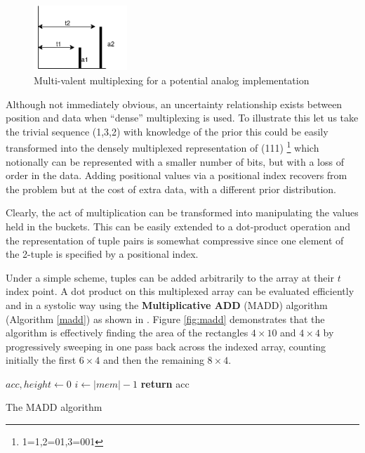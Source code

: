 \documentclass{article}
\begin{document}
\begin{figure}[ht]
	\centerline{\includegraphics[width=100pt]{figures/multiplex2.png}}
	\caption{Multi-valent multiplexing for a potential analog implementation}\label{fig:multiply}
\end{figure}

Although not immediately obvious, an uncertainty relationship exists between position and data when ``dense'' multiplexing is used. To illustrate this let us take the trivial sequence (1,3,2) with knowledge of the prior this could be easily transformed into the densely multiplexed representation of (111) \footnote{1=1,2=01,3=001} which notionally can be represented with a smaller number of bits, but with a loss of order in the data. Adding positional values via a positional index recovers from the problem but at the cost of extra data, with a different prior distribution.

Clearly, the act of multiplication can be transformed into manipulating the values held in the buckets. This can be easily extended to a dot-product operation and the representation of tuple pairs is somewhat compressive since one element of the 2-tuple is specified by a positional index.

Under a simple scheme, tuples can be added arbitrarily to the array at their $t$ index point.  A dot product on this multiplexed array can be evaluated efficiently and in a systolic way using the \textbf{Multiplicative ADD} (MADD) algorithm (Algorithm \ref{madd}) as shown in \cite{jonny-asynch}. Figure \ref{fig:madd} demonstrates that the algorithm is effectively finding the area of the rectangles $4 \times 10$ and $4 \times 4$ by progressively sweeping in one pass back across the indexed array, counting initially the first $6 \times 4$ and then the remaining $8 \times 4$.

\begin{algorithm}
	$acc,height \gets 0$\;
	$i \gets |mem|-1$\;
	\textbf{return} acc
	\caption{The MADD algorithm} \label{madd}
\end{algorithm}
\end{document}
